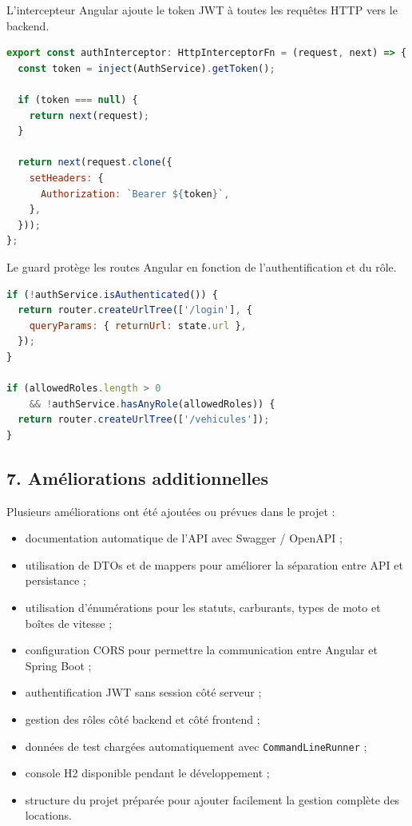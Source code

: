 \documentclass[12pt,a4paper]{article}
\newcommand{\code}[1]{\texttt{#1}}
\newcommand{\question}[1]{\subsection*{#1}}
\begin{document}
L'intercepteur Angular ajoute le token JWT à toutes les requêtes HTTP vers le backend.

\begin{lstlisting}[language=JavaScript]
export const authInterceptor: HttpInterceptorFn = (request, next) => {
  const token = inject(AuthService).getToken();

  if (token === null) {
    return next(request);
  }

  return next(request.clone({
    setHeaders: {
      Authorization: `Bearer ${token}`,
    },
  }));
};
\end{lstlisting}

Le guard protège les routes Angular en fonction de l'authentification et du rôle.

\begin{lstlisting}[language=JavaScript]
if (!authService.isAuthenticated()) {
  return router.createUrlTree(['/login'], {
    queryParams: { returnUrl: state.url },
  });
}

if (allowedRoles.length > 0
    && !authService.hasAnyRole(allowedRoles)) {
  return router.createUrlTree(['/vehicules']);
}
\end{lstlisting}

\question{7. Améliorations additionnelles}

Plusieurs améliorations ont été ajoutées ou prévues dans le projet :

\begin{itemize}
    \item documentation automatique de l'API avec Swagger / OpenAPI ;
    \item utilisation de DTOs et de mappers pour améliorer la séparation entre API et persistance ;
    \item utilisation d'énumérations pour les statuts, carburants, types de moto et boîtes de vitesse ;
    \item configuration CORS pour permettre la communication entre Angular et Spring Boot ;
    \item authentification JWT sans session côté serveur ;
    \item gestion des rôles côté backend et côté frontend ;
    \item données de test chargées automatiquement avec \code{CommandLineRunner} ;
    \item console H2 disponible pendant le développement ;
    \item structure du projet préparée pour ajouter facilement la gestion complète des locations.
\end{itemize}
\end{document}

